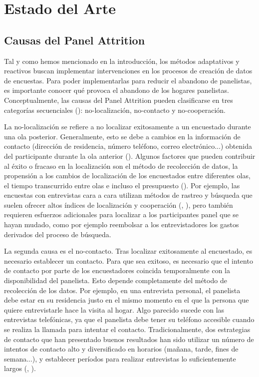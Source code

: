 \chapter{Estado del Arte}
\label{chapter:attrition}
\section{Causas del Panel Attrition}
\label{section:causes_attrition}

Tal y como hemos mencionado en la introducción, los métodos adaptativos y reactivos buscan implementar intervenciones en los procesos de creación de datos de encuestas. Para poder implementarlas para reducir el abandono de panelistas, es importante conocer qué provoca el abandono de los hogares panelistas. Conceptualmente, las causas del Panel Attrition pueden clasificarse en tres categorías secuenciales (\cite{lepkowski2002nonresponse}): no-localización, no-contacto y no-cooperación.

La no-localización se refiere a no localizar exitosamente a un encuestado durante una ola posterior. Generalmente, esto se debe a cambios en la información de contacto (dirección de residencia, número teléfono, correo electrónico...) obtenida del participante durante la ola anterior (\cite{couper2009keeping}). Algunos factores que pueden contribuir al éxito o fracaso en la localización son el método de recolección de datos, la propensión a los cambios de localización de los encuestados entre diferentes olas, el tiempo transcurrido entre olas e incluso el presupuesto (\cite{lynn2009methods}). Por ejemplo, las encuestas con entrevistas cara a cara utilizan métodos de rastreo y búsqueda que suelen ofrecer altos índices de localización y cooperación (\cite{de2005mix}, \cite{couper2009keeping}), pero también requieren esfuerzos adicionales para localizar a los participantes panel que se hayan mudado, como por ejemplo reembolsar a los entrevistadores los gastos derivados del proceso de búsqueda.

La segunda causa es el no-contacto. Tras localizar exitosamente al encuestado, es necesario establecer un contacto. Para que sea exitoso, es necesario que el intento de contacto por parte de los encuestadores coincida temporalmente con la disponibilidad del panelista. Esto depende completamente del método de recolección de los datos. Por ejemplo, en una entrevista personal, el panelista debe estar en su residencia justo en el mismo momento en el que la persona que quiere entrevistarle hace la visita al hogar. Algo parecido sucede con las entrevistas telefónicas, ya que el panelista debe tener su teléfono accesible cuando se realiza la llamada para intentar el contacto. Tradicionalmente, dos estrategias de contacto que han presentado buenos resultados han sido utilizar un número de intentos de contacto alto y diversificado en horarios (mañana, tarde, fines de semana...), y establecer períodos para realizar entrevistas lo suficientemente largos (\cite{nicoletti2005survey}, \cite{watson2009identifying}).

